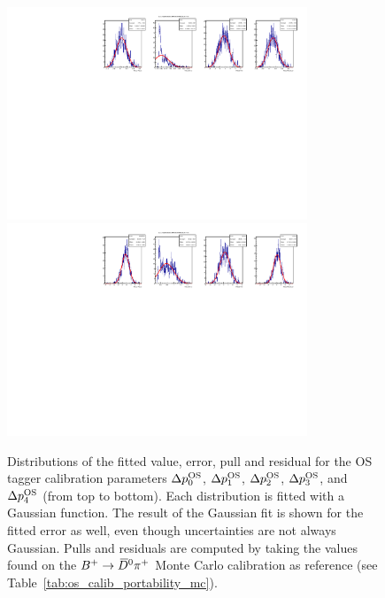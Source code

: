 \begin{figure}[t]
\begin{center}
    \includegraphics[width=0.8\textwidth]{AA-Appdx-mcbootstrap/figs/1DPullPlot_dp_3_RLogisticCalibration_MCTruth_Bu2D0Pi_OS_20171114_SSbarAccAsymmFTFloatDMGammaConstrAllSamples.pdf} \\
    \includegraphics[width=0.8\textwidth]{AA-Appdx-mcbootstrap/figs/1DPullPlot_dp_4_RLogisticCalibration_MCTruth_Bu2D0Pi_OS_20171114_SSbarAccAsymmFTFloatDMGammaConstrAllSamples.pdf} \\
    \end{center}
  \vspace{-2mm}
\caption{Distributions of the fitted value, error, pull and residual for the OS tagger calibration parameters $\Delta p_0^{\rm OS}$, $\Delta p_1^{\rm OS}$, $\Delta p_2^{\rm OS}$, $\Delta p_3^{\rm OS}$, and $\Delta p_4^{\rm OS}$ (from top to bottom). Each distribution is fitted with a Gaussian function. The result of the Gaussian fit is shown for the fitted error as well, even though uncertainties are not always Gaussian. Pulls and residuals are computed by taking the values found on the $B^+\rightarrow \kern 0.2em\overline{\kern -0.2em D}{}^0\pi^+$ Monte Carlo calibration as reference (see Table~\ref{tab:os_calib_portability_mc}).}
  \label{fig:mc_bootstrap_deltaos}
\end{figure}
